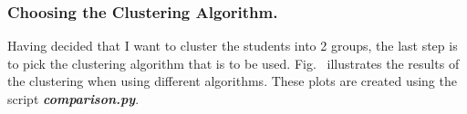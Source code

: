 \subsubsection{Choosing the Clustering Algorithm.}

Having decided that I want to cluster the students into 2 groups, the last step is to pick the clustering algorithm that is to be used. Fig.~ illustrates the results of the clustering when using different algorithms. These plots are created using the script \textbf{\emph{comparison.py}}.

\begin{figure}[h]
	\centering
	

\end{figure}
